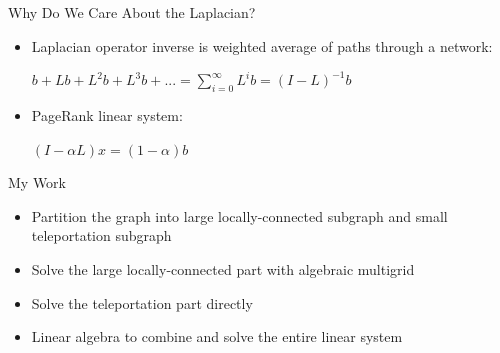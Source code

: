 \documentclass[xcolor=dvipsnames,10pt]{beamer}
\begin{document}
\begin{frame}{Why Do We Care About the Laplacian?}
\begin{itemize}
\item
Laplacian operator inverse is weighted average of paths through a network:\\
\vspace{.2in}
\Large
\begin{center}
$b + Lb + L^{2}b + L^{3}b + ... = \sum_{i=0}^{\infty} L^{i}b = (I - L)^{-1}b$\\
\end{center}
\vspace{.4in}
\normalsize
\item
PageRank linear system:\\
\vspace{.2in}
\Large
\begin{center}
$(I - \alpha L)x = (1 - \alpha)b$
\end{center}
\normalsize
\end{itemize}

\end{frame}
\begin{frame}{My Work}
\begin{itemize}
\item
Partition the graph into large locally-connected subgraph and small teleportation subgraph
\vspace{.1in}
\item
Solve the large locally-connected part with algebraic multigrid
\vspace{.1in}
\item
Solve the teleportation part directly
\vspace{.1in}
\item
Linear algebra to combine and solve the entire linear system
\vspace{.1in}
\end{itemize}
\end{frame}
\end{document}
